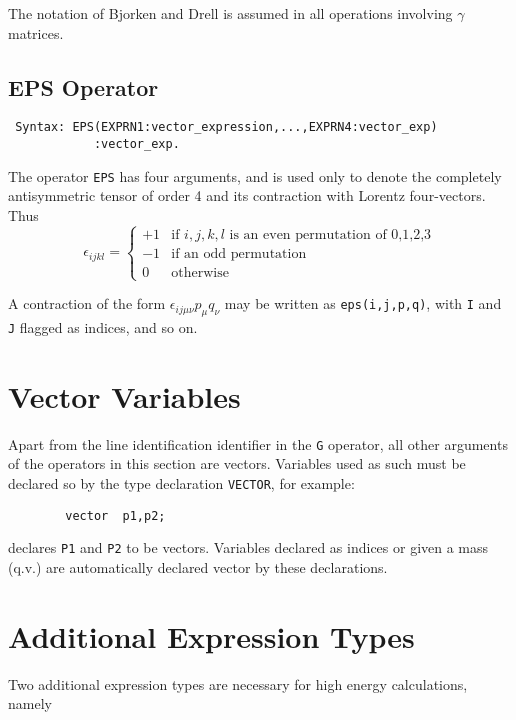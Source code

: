 The notation of Bjorken and Drell is assumed in all operations involving
$\gamma$ matrices.

\subsection{EPS Operator} 
\begin{verbatim}
 Syntax: EPS(EXPRN1:vector_expression,...,EXPRN4:vector_exp)
            :vector_exp.
\end{verbatim}
The operator {\tt EPS} has four arguments, and is used only to denote the
completely antisymmetric tensor of order 4 and its contraction with Lorentz
four-vectors. Thus
\[ \epsilon_{i j k l} = \left\{ \begin{array}{cl}
                                +1 & \mbox{if $i,j,k,l$ is an even permutation
                                              of 0,1,2,3} \\
                                -1 & \mbox{if an odd permutation} \\
                                0 & \mbox{otherwise}
                              \end{array}
                      \right. \]

A contraction of the form $\epsilon_{i j \mu \nu}p_{\mu}q_{\nu}$ may be
written as {\tt eps(i,j,p,q)}, with {\tt I} and {\tt J} flagged as indices,
and so on.

\section{Vector Variables}

Apart from the line identification identifier in the {\tt G} operator, all
other arguments of the operators in this section are vectors.  Variables
used as such must be declared so by the type declaration {\tt VECTOR},
 for example:
\begin{verbatim}
        vector  p1,p2;
\end{verbatim}
declares {\tt P1} and {\tt P2} to be vectors.  Variables declared as
indices or given a mass  (q.v.) are automatically declared
vector by these declarations.

\section{Additional Expression Types}

Two additional expression types are necessary for high energy
calculations, namely

